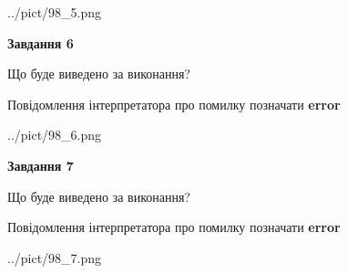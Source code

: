 \documentclass[10pt, ukrainian]{article}
\begin{document}
{\begin {large}
\begin{center}
	{../pict/98_5.png}
\end{center}
\newpage

{\begin {center}\textbf{Завдання 6}\end {center}}\par
Що буде виведено за виконання? \par
Повідомлення інтерпретатора про помилку позначати \textbf{error}

\begin{center}
	{../pict/98_6.png}
\end{center}
\newpage

{\begin {center}\textbf{Завдання 7}\end {center}}\par
Що буде виведено за виконання? \par
Повідомлення інтерпретатора про помилку позначати \textbf{error}

\begin{center}
	{../pict/98_7.png}
\end{center}
\newpage

\end {large}}
\end{document}

